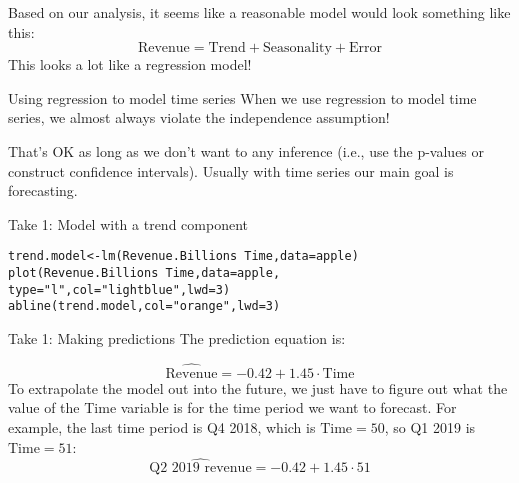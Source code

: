 \documentclass{beamer}\usepackage[]{graphicx}\usepackage[]{color}
\makeatletter
\newcommand{\hlnum}[1]{\textcolor[rgb]{0.824,0.412,0.118}{#1}}%
\newcommand{\hlstr}[1]{\textcolor[rgb]{1,0.894,0.71}{#1}}%
\newcommand{\hlopt}[1]{\textcolor[rgb]{1,0.894,0.769}{#1}}%
\newcommand{\hlstd}[1]{\textcolor[rgb]{1,0.894,0.769}{#1}}%
\newcommand{\hlkwb}[1]{\textcolor[rgb]{0.804,0.776,0.451}{#1}}%
\newcommand{\hlkwc}[1]{\textcolor[rgb]{0.78,0.941,0.545}{#1}}%
\newcommand{\hlkwd}[1]{\textcolor[rgb]{1,0.78,0.769}{#1}}%
\newenvironment{kframe}{%
 \def\at@end@of@kframe{}%
 \ifinner\ifhmode%
  \def\at@end@of@kframe{\end{minipage}}%
  \begin{minipage}{\columnwidth}%
 \fi\fi%
 \def\FrameCommand##1{\hskip\@totalleftmargin \hskip-\fboxsep
 \colorbox{shadecolor}{##1}\hskip-\fboxsep
     \hskip-\linewidth \hskip-\@totalleftmargin \hskip\columnwidth}%
 \MakeFramed {\advance\hsize-\width
   \@totalleftmargin\z@ \linewidth\hsize
   \@setminipage}}%
 {\par\unskip\endMakeFramed%
 \at@end@of@kframe}
\newenvironment{knitrout}{}{} %
\makeatother
\begin{document}
\begin{darkframes}
    \begin{frame}
      Based on our analysis, it seems like a reasonable model would look something like   this:
      \[
        \text{Revenue} = \text{Trend} + \text{Seasonality} + \text{Error}
      \]
      This looks a lot like a regression model!
    \end{frame}

    \begin{frame}{Using regression to model time series}
      When we use regression to model time series, we almost always violate the independence assumption!

      \bigskip\pause

      That's OK as long as we don't want to any inference (i.e., use the p-values or construct confidence intervals). Usually with time series our main goal is \alert{forecasting}.
    \end{frame}

    \begin{frame}[fragile]{Take 1: Model with a trend component}
      \fontvsm
\begin{knitrout}
\begin{kframe}
\begin{alltt}
\hlstd{trend.model} \hlkwb{<-} \hlkwd{lm}\hlstd{(Revenue.Billions} \hlopt{~} \hlstd{Time,} \hlkwc{data}\hlstd{=apple)}
\hlkwd{plot}\hlstd{(Revenue.Billions} \hlopt{~} \hlstd{Time,} \hlkwc{data}\hlstd{=apple,}
  \hlkwc{type}\hlstd{=}\hlstr{"l"}\hlstd{,} \hlkwc{col}\hlstd{=}\hlstr{"lightblue"}\hlstd{,} \hlkwc{lwd}\hlstd{=}\hlnum{3}\hlstd{)}
\hlkwd{abline}\hlstd{(trend.model,} \hlkwc{col}\hlstd{=}\hlstr{"orange"}\hlstd{,} \hlkwc{lwd}\hlstd{=}\hlnum{3}\hlstd{)}
\end{alltt}
\end{kframe}


\end{knitrout}
    \end{frame}

    \begin{frame}{Take 1: Making predictions}
      The prediction equation is:

      \[
        \widehat{\text{Revenue}} =
          -0.42 +
          1.45 \cdot\text{Time}
      \]
      To extrapolate the model out into the future, we just have to figure out what the value of the Time variable is for the time period we want to  forecast. \pause For example, the last time period is Q4 2018, which is $\text{Time}=50$, so Q1 2019 is $\text{Time}=51$:
      \[
        \widehat{\text{Q2 2019 revenue}} =
          -0.42 +
          1.45 \cdot 51
      \]
    \end{frame}


\end{darkframes}
\end{document}
